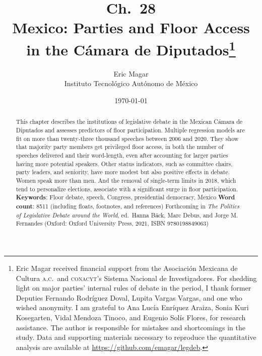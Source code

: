 \documentclass[letter,12pt]{article}
\begin{document}
\title{Ch.\ 28 \\ Mexico: Parties and Floor Access \\ in the Cámara de Diputados\thanks{Eric Magar received financial support from the Asociaci\'on Mexicana de Cultura \textsc{a.c.}\ and \textsc{conacyt}'s Sistema Nacional de Investigadores. For shedding light on major parties' internal rules of debate in the period, I thank former Deputies Fernando Rodríguez Doval, Lupita Vargas Vargas, and one who wished anonymity. I am grateful to Ana Lucía Enríquez Araiza, Sonia Kuri Kosegarten, Vidal Mendoza Tinoco, and Eugenio Solís Flores, for research assistance. The author is responsible for mistakes and shortcomings in the study. Data and supporting materials necessary to reproduce the quantitative analysis are available at \url{https://github.com/emagar/legdeb}.}}
\author{Eric Magar \\ Instituto Tecnológico Autónomo de México}
\date{\today}
\maketitle




\begin{abstract}
\noindent This chapter describes the institutions of legislative debate in the Mexican Cámara de Diputados and assesses predictors of floor participation. Multiple regression models are fit on more than twenty-three thousand speeches between 2006 and 2020. They show that majority party members get privileged floor access, in both the number of speeches delivered and their word-length, even after accounting for larger parties having more potential speakers. Other status indicators, such as committee chairs, party leaders, and seniority, have more modest but also positive effects in debate. Women speak more than men. And the removal of single-term limits in 2018, which tend to personalize elections, associate with a significant surge in floor participation. 
\newline
\newline
\textbf{Keywords}: Floor debate, speech, Congress, presidential democracy, Mexico
\newline
\newline
\textbf{Word count}: 8511 (including floats, footnotes, and references)
\newline
\newline
Forthcoming in \emph{The Politics of Legislative Debate around the World}, ed.\ Hanna B\"ack, Marc Debus, and Jorge M. Fernandes (Oxford: Oxford University Press, 2021, ISBN 9780198849063)
\end{abstract}
\end{document}
